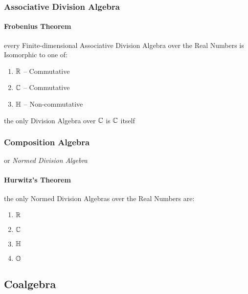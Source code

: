 \subsubsection{Associative Division Algebra}
\label{sec:associative_division_algebra}

\paragraph{Frobenius Theorem}\label{sec:frobenius_theorem}\hfill

every Finite-dimensional Associative Division Algebra over the Real Numbers is
Isomorphic to one of:
\begin{enumerate}
  \item $\mathbb{R}$ -- Commutative
  \item $\mathbb{C}$ -- Commutative
  \item $\mathbb{H}$ -- Non-commutative
\end{enumerate}

the only Division Algebra over $\mathbb{C}$ is $\mathbb{C}$ itself



\subsubsection{Composition Algebra}\label{sec:composition_algebra}

or \emph{Normed Division Algebra}



\paragraph{Hurwitz's Theorem}\label{sec:hurwitzs_theorem}\hfill

the only Normed Division Algebras over the Real Numbers are:
\begin{enumerate}
  \item $\mathbb{R}$
  \item $\mathbb{C}$
  \item $\mathbb{H}$
  \item $\mathbb{O}$
\end{enumerate}



\subsection{Coalgebra}\label{sec:coalgebra}

